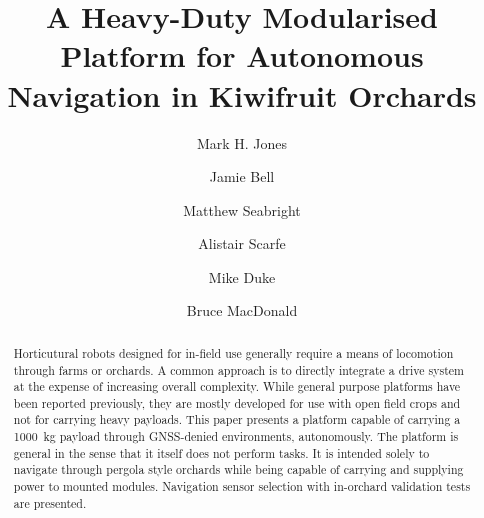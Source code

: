 \documentclass[preprint,authoryear,12pt]{elsarticle}
\begin{document}
\begin{frontmatter}



\title{A Heavy-Duty Modularised Platform for Autonomous Navigation in Kiwifruit Orchards}



\author[UoW]{Mark H. Jones}

\author[UoA]{Jamie Bell}
\author[UoW]{Matthew Seabright}
\author[RPL]{Alistair Scarfe}
\author[UoW]{Mike Duke}
\author[UoA]{Bruce MacDonald}

\address[UoW]{School of Engineering, University of Waikato, Hamilton, New Zealand}
\address[UoA]{Faculty of Engineering, University of Auckland, Auckland, New Zealand}
\address[RPL]{Robotics Plus Ltd, Newnham Innovation Park, Tauranga, New Zealand}


\begin{abstract}
    Horticutural robots designed for in-field use generally require a means of locomotion through farms or orchards.
    A common approach is to directly integrate a drive system at the expense of increasing overall complexity.
    While general purpose platforms have been reported previously, they are mostly developed for use with open field crops and not for carrying heavy payloads.
    This paper presents a platform capable of carrying a \SI{1000}{\kilo\gram} payload through GNSS-denied environments, autonomously.
    The platform is general in the sense that it itself does not perform tasks.
    It is intended solely to navigate through pergola style orchards while being capable of carrying and supplying power to mounted modules.
    Navigation sensor selection with in-orchard validation tests are presented.





\end{abstract}
\end{frontmatter}
\end{document}
